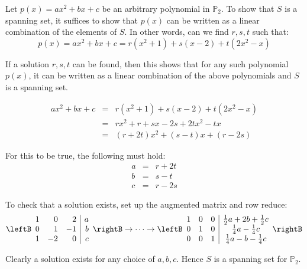 \begin{solution}
Let $p(x)= ax^2 + bx + c$ be an arbitrary polynomial in $\mathbb{P}_2$. To show that $S$ is a spanning set, it suffices to show that $p(x)$ can be written as a linear combination of the elements of $S$. In other words, can we find $r,s,t$ such that:
\[
p(x) =  ax^2 +bx + c = r(x^2 + 1) + s(x -2) + t(2x^2 - x)
\]

If a solution $r,s,t$ can be found, then this shows that for any such polynomial $p(x)$, it can be written as a linear combination of the above polynomials and $S$ is a spanning set. 

\begin{eqnarray*}
ax^2 +bx + c &=& r(x^2 + 1) + s(x -2) + t(2x^2 - x) \\
&=& rx^2 + r + sx - 2s + 2tx^2 - tx \\
&=& (r+2t)x^2 + (s-t)x +  (r-2s) 
\end{eqnarray*}

For this to be true, the following must hold:
\begin{eqnarray*}
a &=& r+2t \\
b &=& s-t \\
c &=& r-2s
\end{eqnarray*}

To check that a solution exists, set up the augmented matrix and row reduce:
\[
\leftB \begin{array}{rrr|r}
1 & 0 & 2 & a \\
0 & 1 & -1 & b \\
1 & -2 & 0 & c 
\end{array} \rightB \rightarrow \cdots \rightarrow 
\leftB \begin{array}{rrr|c} 
1 & 0 & 0 & \frac{1}{2} a + 2b + \frac{1}{2}c\\
0 & 1 & 0 & \frac{1}{4}a - \frac{1}{4}c \\
0 & 0 & 1 & \frac{1}{4}a - b - \frac{1}{4}c 
\end{array} \rightB
\]

Clearly a solution exists for any choice of $a,b,c$. Hence $S$ is a spanning set for $\mathbb{P}_2$. 
\end{solution}